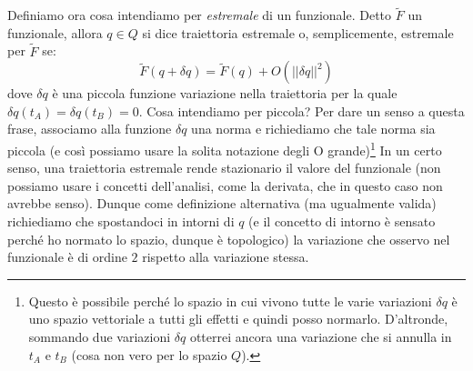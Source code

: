 \documentclass[a4paper,openany]{article}
\begin{document}
	Definiamo ora cosa intendiamo per \textit{estremale} di un funzionale. Detto $\tilde{F}$ un funzionale, allora $q\in Q$ si dice traiettoria estremale o, semplicemente, estremale per $\tilde{F}$ se:
	\begin{equation}\label{key}
		\tilde{F}(q+\delta q) = \tilde{F}(q) + O(||\delta q||^2)
	\end{equation}
	dove $\delta q$ è una piccola funzione variazione nella traiettoria per la quale $\delta q (t_A) = \delta q(t_B) = 0$. Cosa intendiamo per piccola? Per dare un senso a questa frase, associamo alla funzione $\delta q $ una norma e richiediamo che tale norma sia piccola (e così possiamo usare la solita notazione degli O grande)\footnote{Questo è possibile perché lo spazio in cui vivono tutte le varie variazioni $\delta q$ è uno spazio vettoriale a tutti gli effetti e quindi posso normarlo. D'altronde, sommando due variazioni $\delta q$ otterrei ancora una variazione che si annulla in $t_A \mbox{ e } t_B$ (cosa non vero per lo spazio $Q$).} In un certo senso, una traiettoria estremale rende stazionario il valore del funzionale (non possiamo usare i concetti dell'analisi, come la derivata, che in questo caso non avrebbe senso). Dunque come definizione alternativa (ma ugualmente valida) richiediamo che spostandoci in intorni di $q$ (e il concetto di intorno è sensato perché ho normato lo spazio, dunque è topologico) la variazione che osservo nel funzionale è di ordine $2$ rispetto alla variazione stessa. 
	
\end{document}
